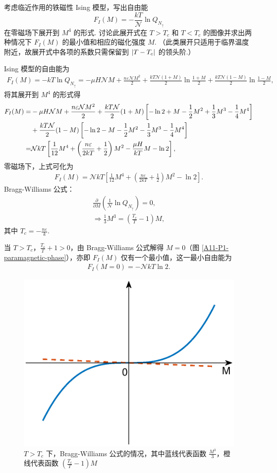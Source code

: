 \documentclass{assignment}
\begin{document}
\begin{prob}
    考虑临近作用的铁磁性 Ising 模型，写出自由能
    \[
        F_I(M)=-\frac{kT}{\mathcal{N}}\ln Q_{N_{\uparrow}}
    \]
    在零磁场下展开到 $M^4$ 的形式. 讨论此展开式在 $T>T_c$ 和 $T<T_c$ 的图像并求出两种情况下 $F_I(M)$ 的最小值和相应的磁化强度 $M$. （此类展开只适用于临界温度附近，故展开式中各项的系数只需保留到 $\left\lvert T-T_c\right\rvert$ 的领头阶.）
\end{prob}
\begin{sol}
    Ising 模型的自由能为
    \begin{align}
        F_I(M)=-kT\ln Q_{N_{\uparrow}}=-\mu H\mathcal{N}M+\frac{n\varepsilon\mathcal{N}M^2}{2}+\frac{kT\mathcal{N}(1+M)}{2}\ln\frac{1+M}{2}+\frac{kT\mathcal{N}(1-M)}{2}\ln\frac{1-M}{2},
    \end{align}
    将其展开到 $M^4$ 的形式得
    \begin{align}
        \notag F_I(M)=&-\mu H\mathcal{N}M+\frac{n\varepsilon\mathcal{N}M^2}{2}+\frac{kT\mathcal{N}}{2}(1+M)\left[-\ln 2+M-\frac{1}{2}M^2+\frac{1}{3}M^3-\frac{1}{4}M^4\right]\\
        \notag&+\frac{kT\mathcal{N}}{2}(1-M)\left[-\ln 2-M-\frac{1}{2}M^2-\frac{1}{3}M^3-\frac{1}{4}M^4\right]\\
        =&\mathcal{N}kT\left[\frac{1}{12}M^4+\left(\frac{n\varepsilon}{2kT}+\frac{1}{2}\right)M^2-\frac{\mu H}{kT}M-\ln 2\right],
    \end{align}
    零磁场下，上式可化为
    \begin{align}
        F_I(M)=\mathcal{N}kT\left[\frac{1}{12}M^4+\left(\frac{n\varepsilon}{2kT}+\frac{1}{2}\right)M^2-\ln 2\right].
    \end{align}
    Bragg-Williams 公式：
    \begin{gather}
        \frac{\partial}{\partial M}\left(\frac{1}{\mathcal{N}}\ln Q_{N_{\uparrow}}\right)=0,\\
        \Longrightarrow \frac{1}{3}M^3=\left(\frac{T_c}{T}-1\right)M,
    \end{gather}
    其中 $T_c=-\frac{n\varepsilon}{k}$.

    当 $T>T_c$，$\frac{T_c}{T}+1>0$，由 Bragg-Williams 公式解得 $M=0$（图 \eqref{A11-P1-paramagnetic-phase}），亦即 $F_I(M)$ 仅有一个最小值，这一最小自由能为
    \begin{align}
        F_I(M=0)=-\mathcal{N}kT\ln 2.
    \end{align}
    \begin{figure}[H]
        \centering
        \includegraphics[width=.4\columnwidth]{A11-P1-paramagnetic-phase.eps}
        \caption{$T>T_c$ 下，Bragg-Williams 公式的情况，其中蓝线代表函数 $\frac{M^3}{3}$，橙线代表函数 $\left(\frac{T_c}{T}-1\right)M$}
        \label{A11-P1-paramagnetic-phase}
    \end{figure}


\end{sol}
\end{document}
